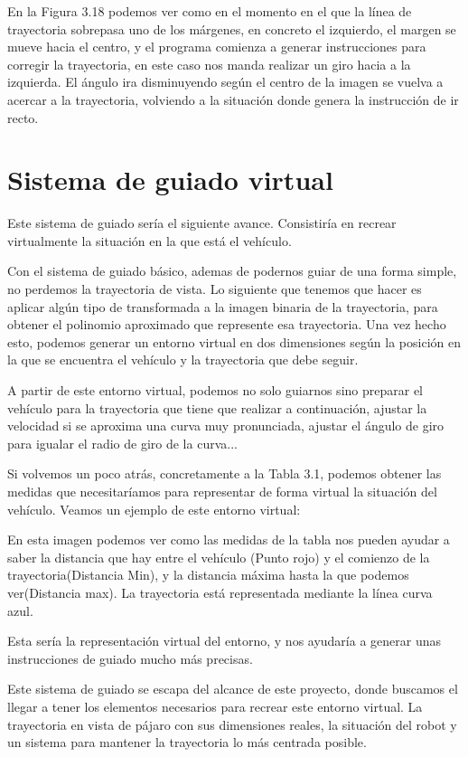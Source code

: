 
En la Figura 3.18 podemos ver como en el momento en el que la línea de trayectoria sobrepasa uno de los márgenes, en concreto el izquierdo, el margen se mueve hacia el centro, y el programa comienza a generar instrucciones para corregir la trayectoria, en este caso nos manda realizar un giro hacia a la izquierda. El ángulo ira disminuyendo según el centro de la imagen se vuelva a acercar a la trayectoria, volviendo a la situación donde genera la instrucción de ir recto.


\section{Sistema de guiado virtual}
Este sistema de guiado sería el siguiente avance. Consistiría en recrear virtualmente la situación en la que está el vehículo. 

Con el sistema de guiado básico, ademas de podernos guiar de una forma simple, no perdemos la trayectoria de vista. Lo siguiente que tenemos que hacer es aplicar algún tipo de transformada a la imagen binaria de la trayectoria, para obtener el polinomio aproximado que represente esa trayectoria. Una vez hecho esto, podemos generar un entorno virtual en dos dimensiones según la posición en la que se encuentra el vehículo y la trayectoria que debe seguir.

A partir de este entorno virtual, podemos no solo guiarnos sino preparar el vehículo para la trayectoria que tiene que realizar a continuación, ajustar la velocidad si se aproxima una curva muy pronunciada, ajustar el ángulo de giro para igualar el radio de giro de la curva...

Si volvemos un poco atrás, concretamente a la Tabla 3.1, podemos obtener las medidas que necesitaríamos para representar de forma virtual la situación del vehículo. Veamos un ejemplo de este entorno virtual:


En esta imagen podemos ver como las medidas de la tabla nos pueden ayudar a saber la distancia que hay entre el vehículo (Punto rojo) y el comienzo de la trayectoria(Distancia Min), y la distancia máxima hasta la que podemos ver(Distancia max). La trayectoria está representada mediante la línea curva azul.

Esta sería la representación virtual del entorno, y nos ayudaría a generar unas instrucciones de guiado mucho más precisas. 

Este sistema de guiado se escapa del alcance de este proyecto, donde buscamos el llegar a tener los elementos necesarios para recrear este entorno virtual. La trayectoria en vista de pájaro con sus dimensiones reales, la situación del robot y un sistema para mantener la trayectoria lo más centrada posible.
